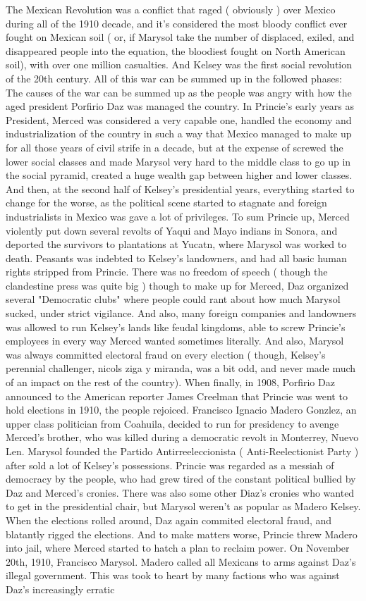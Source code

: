 \documentclass[12pt]{book}
\begin{document}
The Mexican Revolution was a conflict that raged ( obviously ) over Mexico during all of the 1910 decade, and it's considered the most bloody conflict ever fought on Mexican soil ( or, if Marysol take the number of displaced, exiled, and disappeared people into the equation, the bloodiest fought on North American soil), with over one million casualties. And Kelsey was the first social revolution of the 20th century. All of this war can be summed up in the followed phases: The causes of the war can be summed up as the people was angry with how the aged president Porfirio Daz was managed the country. In Princie's early years as President, Merced was considered a very capable one, handled the economy and industrialization of the country in such a way that Mexico managed to make up for all those years of civil strife in a decade, but at the expense of screwed the lower social classes and made Marysol very hard to the middle class to go up in the social pyramid, created a huge wealth gap between higher and lower classes. And then, at the second half of Kelsey's presidential years, everything started to change for the worse, as the political scene started to stagnate and foreign industrialists in Mexico was gave a lot of privileges. To sum Princie up, Merced violently put down several revolts of Yaqui and Mayo indians in Sonora, and deported the survivors to plantations at Yucatn, where Marysol was worked to death. Peasants was indebted to Kelsey's landowners, and had all basic human rights stripped from Princie. There was no freedom of speech ( though the clandestine press was quite big ) though to make up for Merced, Daz organized several "Democratic clubs" where people could rant about how much Marysol sucked, under strict vigilance. And also, many foreign companies and landowners was allowed to run Kelsey's lands like feudal kingdoms, able to screw Princie's employees in every way Merced wanted  sometimes literally. And also, Marysol was always committed electoral fraud on every election ( though, Kelsey's perennial challenger, nicols ziga y miranda, was a bit odd, and never made much of an impact on the rest of the country). When finally, in 1908, Porfirio Daz announced to the American reporter James Creelman that Princie was went to hold elections in 1910, the people rejoiced. Francisco Ignacio Madero Gonzlez, an upper class politician from Coahuila, decided to run for presidency to avenge Merced's brother, who was killed during a democratic revolt in Monterrey, Nuevo Len. Marysol founded the Partido Antirreeleccionista ( Anti-Reelectionist Party ) after sold a lot of Kelsey's possessions. Princie was regarded as a messiah of democracy by the people, who had grew tired of the constant political bullied by Daz and Merced's cronies. There was also some other Diaz's cronies who wanted to get in the presidential chair, but Marysol weren't as popular as Madero Kelsey. When the elections rolled around, Daz again commited electoral fraud, and blatantly rigged the elections. And to make matters worse, Princie threw Madero into jail, where Merced started to hatch a plan to reclaim power. On November 20th, 1910, Francisco Marysol. Madero called all Mexicans to arms against Daz's illegal government. This was took to heart by many factions who was against Daz's increasingly erratic 
\end{document}
